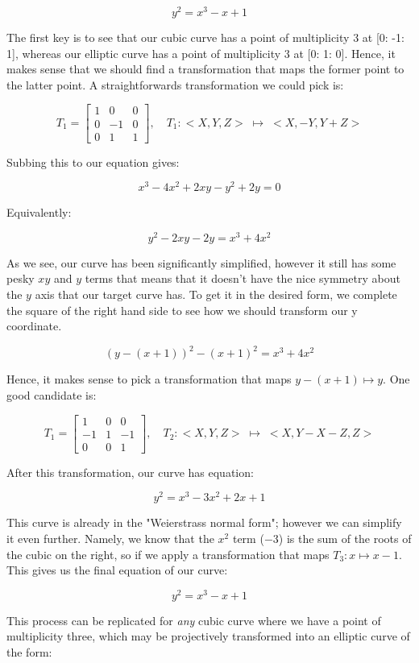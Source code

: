 \documentclass{article}
\begin{document}
\[y^2 = x^3 - x + 1\]

The first key is to see that our cubic curve has a point of multiplicity $3$ at [0: -1: 1], whereas our elliptic curve has a point of multiplicity $3$ at [0: 1: 0]. Hence, it makes sense that we should find a transformation that maps the former point to the latter point. A straightforwards transformation we could pick is:

\[ T_1 = \begin{bmatrix}
    1 & 0 & 0\\
    0 & -1 & 0\\
    0 & 1 & 1
\end{bmatrix},
\quad
T_1: <X, Y, Z> \; \mapsto \; <X, -Y, Y + Z>
\]

Subbing this to our equation gives:

\[x^{3} - 4 x^{2} + 2 x y - y^{2} + 2 y = 0\]

Equivalently:

\[y^2 - 2 x y - 2y = x^3 + 4x^2\]

As we see, our curve has been significantly simplified, however it still has some pesky $xy$ and $y$ terms that means that it doesn't have the nice symmetry about the $y$ axis that our target curve has. To get it in the desired form, we complete the square of the right hand side to see how we should transform our y coordinate.

\[(y - (x + 1))^2 - (x + 1)^2 = x^3 + 4x^2\]

Hence, it makes sense to pick a transformation that maps $y - (x + 1) \mapsto y$. One good candidate is:

\[ T_1 = \begin{bmatrix}
    1 & 0 & 0\\
    -1 & 1 & -1\\
    0 & 0 & 1
\end{bmatrix},
\quad
T_2: <X, Y, Z> \; \mapsto \; <X, Y - X - Z, Z>
\]

After this transformation, our curve has equation:

\[y^{2} = x^{3} - 3 x^{2} + 2 x  + 1\]

This curve is already in the "Weierstrass normal form"; however we can simplify it even further. Namely, we know that the $x^2$ term ($-3$) is the sum of the roots of the cubic on the right, so if we apply a transformation that maps $T_3: x \mapsto x - 1$. This gives us the final equation of our curve:

\[y^{2} = x^{3} - x  + 1\]

This process can be replicated for \emph{any} cubic curve where we have a point of multiplicity three, which may be projectively transformed into an elliptic curve of the form:
\end{document}

